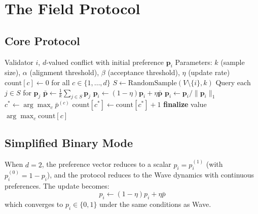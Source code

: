 \section{The Field Protocol}

\label{sec:protocol}

\subsection{Core Protocol}

\begin{algorithm}[H]
\caption{Field Protocol --- Multi-Valued Consensus}
\label{alg:field-core}
\begin{algorithmic}[1]
\Require Validator $i$, $d$-valued conflict with initial preference $\mathbf{p}_i$
\Require Parameters: $k$ (sample size), $\alpha$ (alignment threshold), $\beta$ (acceptance threshold), $\eta$ (update rate)
\State $\text{count}[c] \gets 0$ for all $c \in \{1, \ldots, d\}$
    \State $S \gets \text{RandomSample}(V \setminus \{i\}, k)$
    \State Query each $j \in S$ for $\mathbf{p}_j$
    \State $\bar{\mathbf{p}} \gets \frac{1}{k} \sum_{j \in S} \mathbf{p}_j$ 
    \State {}
    \State $\mathbf{p}_i \gets (1 - \eta) \mathbf{p}_i + \eta \bar{\mathbf{p}}$ 
    \State $\mathbf{p}_i \gets \mathbf{p}_i / \|\mathbf{p}_i\|_1$ 
    \State $c^* \gets \arg\max_c \bar{p}^{(c)}$ 
     
        \State $\text{count}[c^*] \gets \text{count}[c^*] + 1$
    \EndIf
        \State \textbf{finalize} value $\arg\max_c \text{count}[c]$
    \EndIf
\EndWhile
\end{algorithmic}
\end{algorithm}

\subsection{Simplified Binary Mode}

When $d = 2$, the preference vector reduces to a scalar $p_i = p_i^{(1)}$ (with
$p_i^{(0)} = 1 - p_i$), and the protocol reduces to the Wave dynamics with continuous
preferences. The update becomes:
\[
p_i \gets (1 - \eta) p_i + \eta \bar{p}
\]
which converges to $p_i \in \{0, 1\}$ under the same conditions as Wave.

